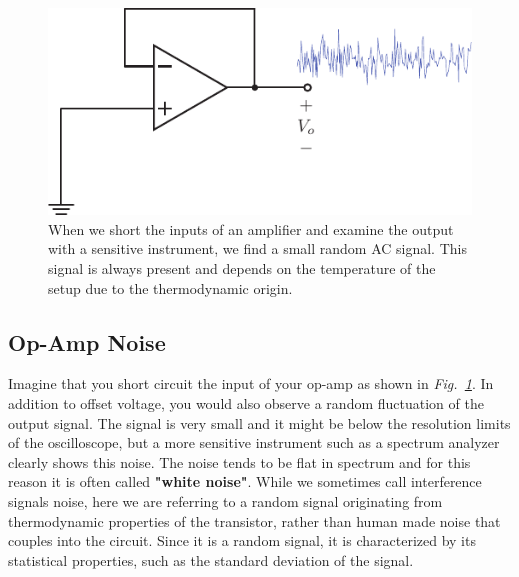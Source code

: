 \newpage
\begin{figure}[t]
\centering
\includegraphics[scale=1.15]{opamp_unitygain_noise}
\caption{When we short the inputs of an amplifier and examine the output with a sensitive instrument, we find a small random AC signal.  This signal is always present and depends on the temperature of the setup due to the thermodynamic origin.}
\label{fig:opamp_unitygain_noise_fig}
\end{figure}
\subsection{Op-Amp Noise}
Imagine that you short circuit the input of your op-amp as shown in \emph{Fig.~\ref{fig:opamp_unitygain_noise_fig}}. In addition to offset voltage, you would also observe a random fluctuation of the output signal.  The signal is very small and it might be below the resolution limits of the oscilloscope, but a more sensitive instrument such as a spectrum analyzer clearly shows this noise.  The noise tends to be flat in spectrum and for this reason it is often called \textbf{"white noise"}.  While we sometimes call interference signals noise, here we are referring to a random signal originating from thermodynamic properties of the transistor, rather than human made noise that couples into the circuit.   Since it is a random signal, it is characterized by its statistical properties, such as the standard deviation of the signal.  

